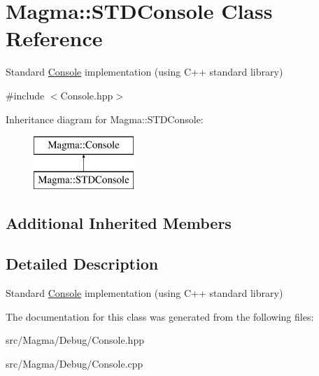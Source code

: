 \hypertarget{class_magma_1_1_s_t_d_console}{}\section{Magma\+:\+:S\+T\+D\+Console Class Reference}
\label{class_magma_1_1_s_t_d_console}


Standard \hyperlink{class_magma_1_1_console}{Console} implementation (using C++ standard library)  




{\ttfamily \#include $<$Console.\+hpp$>$}

Inheritance diagram for Magma\+:\+:S\+T\+D\+Console\+:\begin{figure}[H]
\begin{center}
\leavevmode
\includegraphics[height=2.000000cm]{class_magma_1_1_s_t_d_console}
\end{center}
\end{figure}
\subsection*{Additional Inherited Members}


\subsection{Detailed Description}
Standard \hyperlink{class_magma_1_1_console}{Console} implementation (using C++ standard library) 



The documentation for this class was generated from the following files\+:\begin{DoxyCompactItemize}
\item 
src/\+Magma/\+Debug/Console.\+hpp\item 
src/\+Magma/\+Debug/Console.\+cpp\end{DoxyCompactItemize}
